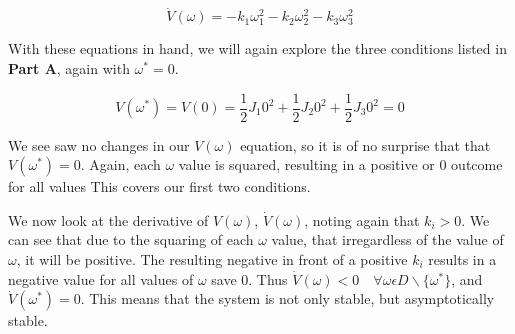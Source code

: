 \documentclass{article}
\begin{document}
\[
    \dot{V}(\omega) = -k_1 \omega_1^2 - k_2 \omega_2^2 - k_3 \omega_3^2
\]

With these equations in hand, we will again explore the three conditions listed in \textbf{Part A}, again with $\omega^*=0$.

\[
    V(\omega^*) = V(0) = \frac{1}{2} J_1 0^2 + \frac{1}{2} J_2 0^2 + \frac{1}{2} J_3 0^2 = 0
\]

We see saw no changes in our $V(\omega)$ equation, so it is of no surprise that that $V(\omega^*) = 0$. Again, each $\omega$ value is squared, resulting in a positive or 0 outcome for all values This covers our first two conditions.

We now look at the derivative of $V(\omega)$, $\dot{V}(\omega)$, noting again that $k_i > 0$. We can see that due to the squaring of each $\omega$ value, that irregardless of the value of $\omega$, it will be positive. The resulting negative in front of a positive $k_i$ results in a negative value for all values of $\omega$ save $0$. Thus $\dot{V}(\omega) < 0 \quad \forall \omega \epsilon D \backslash \{\omega^*\}$, and $\dot{V}(\omega^*)=0$. This means that the system is not only stable, but asymptotically stable.
\end{document}
